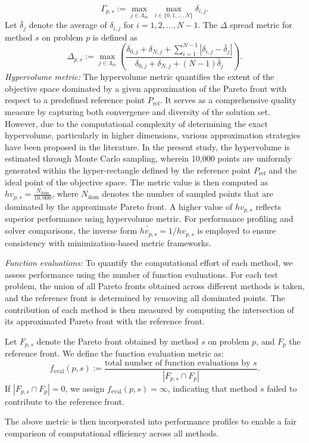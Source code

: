\documentclass[amsa]{ipart}
\theoremstyle{plain}
\numberwithin{equation}{section}
\begin{document}
\begin{equation*}
   \Gamma_{p,s} := \max_{j \in \Lambda_m} ~\max_{i \in \{0,1,\ldots,N\}} \delta_{i,j}.
\end{equation*}
Let $\bar{\delta}_j$ denote the average of $\delta_{i,j}$ for $i = 1, 2, \ldots, N - 1$. The $\Delta$ spread metric for method $s$ on problem $p$ is defined as
\begin{equation*}
    \Delta_{p,s} := \max_{j \in \Lambda_m} \left( \frac{\delta_{0,j} + \delta_{N,j} + \sum_{i=1}^{N-1} |\delta_{i,j} - \bar{\delta}_j|}{\delta_{0,j} + \delta_{N,j} + (N-1)\bar{\delta}_j} \right).
\end{equation*}
\textit{Hypervolume metric:} The hypervolume metric quantifies the extent of the objective space dominated by a given approximation of the Pareto front with respect to a predefined reference point \( P_{\text{ref}} \). It serves as a comprehensive quality measure by capturing both convergence and diversity of the solution set. However, due to the computational complexity of determining the exact hypervolume, particularly in higher dimensions, various approximation strategies have been proposed in the literature. In the present study, the hypervolume is estimated through Monte Carlo sampling, wherein 10{,}000 points are uniformly generated within the hyper-rectangle defined by the reference point \( P_{\text{ref}} \) and the ideal point of the objective space. The metric value is then computed as $hv_{p,s} = \frac{N_{\text{dom}}}{10{,}000}$, where \( N_{\text{dom}} \) denotes the number of sampled points that are dominated by the approximate Pareto front. A higher value of \( hv_{p,s} \) reflects superior performance using hypervolume metric. For performance profiling and solver comparisons, the inverse form \( \widetilde{hv_{p,s}} = 1 / hv_{p,s} \) is employed to ensure consistency with minimization-based metric frameworks.

\textit{Function evaluations:} 
To quantify the computational effort of each method, we assess performance using the number of function evaluations. For each test problem, the union of all Pareto fronts obtained across different methods is taken, and the reference front is determined by removing all dominated points. The contribution of each method is then measured by computing the intersection of its approximated Pareto front with the reference front.  

Let $F_{p,s}$ denote the Pareto front obtained by method $s$ on problem $p$, and $F_p$ the reference front. We define the function evaluation metric as:
\[
   f_{\text{eval}}(p,s) := \frac{\text{total number of function evaluations by } s}{|F_{p,s} \cap F_p|}.
\]
If $|F_{p,s} \cap F_p| = 0$, we assign $f_{\text{eval}}(p,s) = \infty$, indicating that method $s$ failed to contribute to the reference front.
\par The above metric is then incorporated into performance profiles to enable a fair comparison of computational efficiency across all methods.
\end{document}

